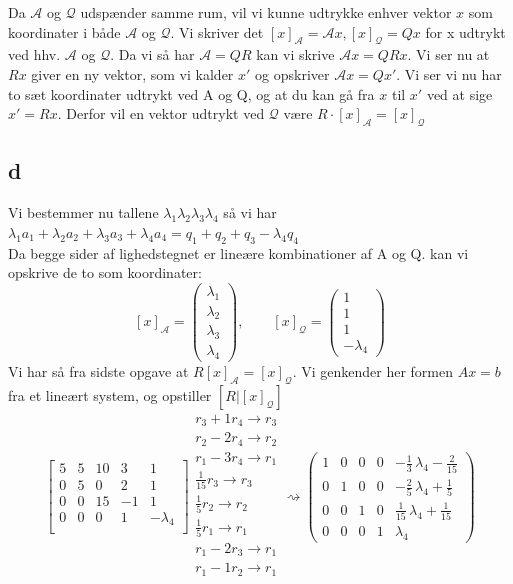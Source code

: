 \documentclass[a4paper,fleqn]{article}
\newcommand{\A}{\mathcal{A}}
\newcommand{\Q}{\mathcal{Q}}
\begin{document}
	Da $\A$ og $\Q$ udspænder samme rum, vil vi kunne udtrykke enhver vektor $x$ som
	koordinater i både $\A$ og $\Q$. Vi skriver det $[x]_\A = \A x, [x]_\Q = Qx$ for x udtrykt
	ved hhv. $\A$ og $\Q$. Da vi så har $\A = QR$ kan vi skrive $\A x = QRx$. Vi ser nu at $Rx$
	giver en ny vektor, som vi kalder $x'$ og opskriver $\A x = Qx'$. Vi ser vi nu har to sæt
	koordinater udtrykt ved A og Q, og at du kan gå fra $x$ til $x'$ ved at sige $x' = Rx$.
	Derfor vil en vektor udtrykt ved $\Q$ være $R\cdot [x]_\A = [x]_\Q$

	\subsection{d}
	Vi bestemmer nu tallene $\lambda_1 \lambda_2 \lambda_3 \lambda_4$ så vi har 
	$\lambda_1 a_1 + \lambda_2a_2 + \lambda_3a_3 + \lambda_4a_4 = 
	q_1 + q_2 +q_3 - \lambda_4q_4$\\
	Da begge sider af lighedstegnet er lineære kombinationer af A og Q. kan vi opskrive de to
	som koordinater:
	\[ [x]_\A = \begin{pmatrix}\lambda_1\\ \lambda_2\\\lambda_3\\\lambda_4\end{pmatrix}, \qquad
	   [x]_\Q = \begin{pmatrix}1\\1\\1\\-\lambda_4\end{pmatrix}
	\]
	Vi har så fra sidste opgave at $R[x]_\A = [x]_\Q$. Vi genkender her formen $Ax = b$ fra et
	lineært system, og opstiller $[R|[x]_\Q]$
	\[
		\left[\begin{array}{cccc|c}
			5 & 5 & 10 & 3 & 1\\
			0 & 5 & 0 & 2 & 1\\
			0 & 0 & 15 & -1 & 1\\
			0 & 0 & 0 & 1 & -\lambda_4\\
		\end{array}\right]
		\begin{array}{l}
			r_3 + 1r_4 \rightarrow r_3\\
			r_2 - 2r_4 \rightarrow r_2\\
			r_1 - 3r_4 \rightarrow r_1\\
			\frac{1}{15}r_3 \rightarrow r_3\\
			\frac{1}{5}r_2 \rightarrow r_2\\
			\frac{1}{5}r_1 \rightarrow r_1\\
			r_1 - 2r_3 \rightarrow r_1\\
			r_1 - 1r_2 \rightarrow r_1\\
		\end{array} \rightsquigarrow
		\left(\begin{array}{rrrr|r}
			1 & 0 & 0 & 0 & -\frac{1}{3} \, \lambda_4 - \frac{2}{15} \\
			0 & 1 & 0 & 0 & -\frac{2}{5} \, \lambda_4 + \frac{1}{5} \\
			0 & 0 & 1 & 0 & \frac{1}{15} \, \lambda_4 + \frac{1}{15} \\
			0 & 0 & 0 & 1 & \lambda_4
		\end{array}\right)
	\]
\end{document}
